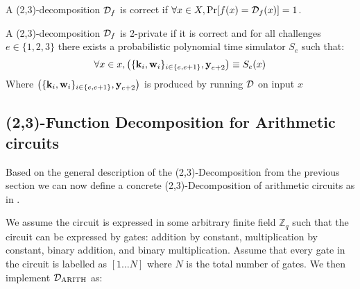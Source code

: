 \begin{definition}[Correctness]
\label{def:decomp_correctness}
A (2,3)-decomposition $\mathcal{D}_{f}$ is correct if
$\forall x \in X, \operatorname{Pr}[f(x) = \mathcal{D}_{f}(x)] = 1$.
\end{definition}

\begin{definition}[Privacy]
\label{def:decomp_privacy}
A (2,3)-decomposition $\mathcal{D}_{f}$ is 2-private if it is correct and for all challenges
$e \in \{1,2,3\}$ there exists a probabilistic polynomial time simulator $S_{e}$
such that:
\[
  \forall x \in x, \left(\{\textbf{k}_{i}, \textbf{w}_{i} \}_{i \in \{e, e+1\}}, \textbf{y}_{e+2} \right)
  \equiv S_{e}(x)
\]
Where $\left(\{\textbf{k}_{i}, \textbf{w}_{i} \}_{i \in \{e, e+1\}}, \textbf{y}_{e+2}
\right)$ is produced by running $\mathcal{D}$ on input $x$
\end{definition}

\subsection{(2,3)-Function Decomposition for Arithmetic circuits}
\label{subsec:general:arith}
Based on the general description of the (2,3)-Decomposition from the previous
section we can now define a concrete (2,3)-Decomposition of arithmetic circuits
as in \citet{zkboo}.

We assume the circuit is expressed in some arbitrary finite field
$\mathbb{Z}_{q}$ such that the circuit can be expressed by gates: addition by constant,
multiplication by constant, binary addition, and binary multiplication.
Assume that every gate in the circuit is labelled as $[1 \dots N]$ where $N$ is
the total number of gates.
We then implement $\mathcal{D}_{\text{ARITH}}$ as:

